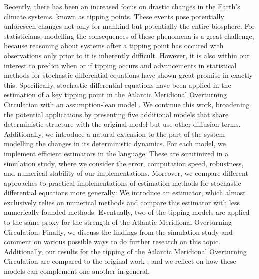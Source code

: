 \noindent Recently, there has been an increased focus on drastic changes in the Earth's climate systems, known as tipping points. These events pose potentially unforeseen changes not only for mankind but potentially the entire biosphere. For statisticians, modelling the consequences of these phenomena is a great challenge, because reasoning about systems after a tipping point has occured with observations only prior to it is inherently difficult. However, it is also within our interest to predict when or if tipping occurs and advancements in statistical methods for stochastic differential equations \cite{SplittingSchemes} have shown great promise in exactly this. Specifically, stochastic differential equations have been applied in the estimation of a key tipping point in the Atlantic Meridional Overturning Circulation with an assumption-lean model \cite{Ditlevsen2023}. We continue this work, broadening the potential applications by presenting five additional models that share deterministic structure with the original model but use other diffusion terms. Additionally, we introduce a natural extension to the part of the system modelling the changes in its deterministic dynamics. For each model, we implement efficient estimators in the  language\cite{Rlang}. These are scrutinized in a simulation study, where we consider the error, computation speed, robustness, and numerical stability of our implementations. Moreover, we compare different approaches to practical implementations of estimation methods for stochastic differential equations more generally: We introduce an estimator, which almost exclusively relies on numerical methods and compare this estimator with less numerically founded methods. Eventually, two of the tipping models are applied to the same proxy for the strength of the Atlantic Meridional Overturning Circulation. Finally, we discuss the findings from the simulation study and comment on various possible ways to do further research on this topic. Additionally, our results for the tipping of the Atlantic Meridional Overturning Circulation are compared to the original work \cite{Ditlevsen2023}; and we reflect on how these models can complement one another in general.